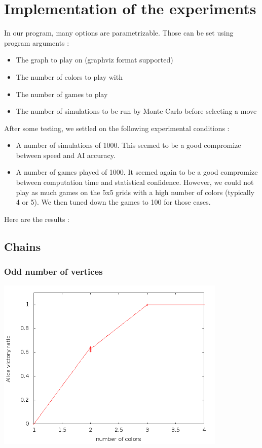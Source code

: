 \section{Implementation of the experiments}


In our program, many options are parametrizable. Those can be set using program arguments :
\begin{itemize}
\item The graph to play on (graphviz format supported)
\item The number of colors to play with
\item The number of games to play
\item The number of simulations to be run by Monte-Carlo before selecting a move
\end{itemize}
After some testing, we settled on the following experimental conditions :
\begin{itemize}
\item A number of simulations of 1000. This seemed to be a good compromize between speed and AI accuracy.
\item A number of games played of 1000. It seemed again to be a good compromize between computation time and statistical confidence. However, we could not play as much games on the 5x5 grids with a high number of colors (typically 4 or 5). We then tuned down the games to 100 for those cases. 
\end{itemize}

Here are the results :\\

\subsection{Chains}

\subsubsection{Odd number of vertices}

\includegraphics[width=11cm]{resultats/chaineimpaire.png}

